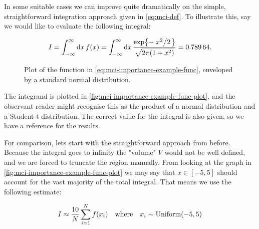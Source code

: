 \documentclass[Thesis.tex]{subfiles}
\begin{document}
In some suitable cases we can improve quite dramatically on the simple,
straightforward integration approach given in \cref{eq:mci-def}. To illustrate this, say we
would like to evaluate the following integral:

\begin{align}
    \label{eq:mci-importance-example-func}
    I = \intfy\dd{x}f(x)=\intfy\dd{x} \frac{\exp{-\flatfrac{x^2}{2} }}{\sqrt{2\pi \qty(1 +x^2)}}  = \num{0.78964}.
\end{align}

\begin{figure}
    \centering
    \caption{\label{fig:mci-importance-example-func-plot}Plot of the function in
      \cref{eq:mci-importance-example-func}, enveloped by a standard normal distribution.}
\end{figure}
The integrand is plotted in \autoref{fig:mci-importance-example-func-plot}, and
the observant reader might recognise this as the product of a normal
distribution and a Student-t distribution. The correct value for the integral
is also given, so we have a reference for the results.

For comparison, lets start with the straightforward approach from before.
Because the integral goes to infinity the "volume" $V$ would not be well
defined, and we are forced to truncate the region manually. From looking at the
graph in \autoref{fig:mci-importance-example-func-plot} we may say that $x\in
[-5, 5]$ should account for the vast majority of the total integral. That means
we use the following estimate:

\begin{align}
    \label{eq:chp-mc-anon-2}
    I\approx \frac{10}{N}\sum_{i=1}^Nf(x_i)\qq{where} x_i\sim\text{Uniform}(-5, 5)
\end{align}
\end{document}
